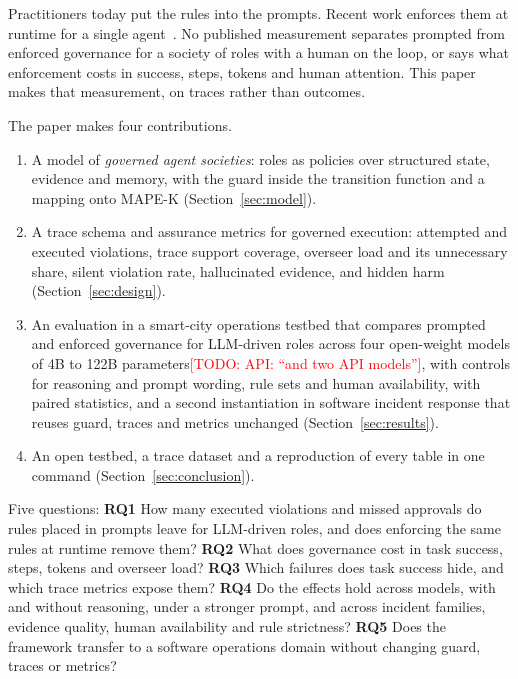 \documentclass[10pt,conference]{IEEEtran}
\newcommand{\todo}[1]{\textcolor{red}{[TODO: #1]}}
\newcommand{\RQ}[1]{\textbf{RQ#1}}
\begin{document}
Practitioners today put the rules into the prompts. Recent work enforces them at runtime for a single agent~\cite{wang2026agentspec}. No published measurement separates prompted from enforced governance for a society of roles with a human on the loop, or says what enforcement costs in success, steps, tokens and human attention. This paper makes that measurement, on traces rather than outcomes.

The paper makes four contributions.
\begin{enumerate}
    \item A model of \emph{governed agent societies}: roles as policies over structured state, evidence and memory, with the guard inside the transition function and a mapping onto MAPE-K (Section~\ref{sec:model}).
    \item A trace schema and assurance metrics for governed execution: attempted and executed violations, trace support coverage, overseer load and its unnecessary share, silent violation rate, hallucinated evidence, and hidden harm (Section~\ref{sec:design}).
    \item An evaluation in a smart-city operations testbed that compares prompted and enforced governance for LLM-driven roles across four open-weight models of 4B to 122B parameters\todo{API: ``and two API models''}, with controls for reasoning and prompt wording, rule sets and human availability, with paired statistics, and a second instantiation in software incident response that reuses guard, traces and metrics unchanged (Section~\ref{sec:results}).
    \item An open testbed, a trace dataset and a reproduction of every table in one command (Section~\ref{sec:conclusion}).
\end{enumerate}

Five questions: \RQ{1} How many executed violations and missed approvals do rules placed in prompts leave for LLM-driven roles, and does enforcing the same rules at runtime remove them? \RQ{2} What does governance cost in task success, steps, tokens and overseer load? \RQ{3} Which failures does task success hide, and which trace metrics expose them? \RQ{4} Do the effects hold across models, with and without reasoning, under a stronger prompt, and across incident families, evidence quality, human availability and rule strictness? \RQ{5} Does the framework transfer to a software operations domain without changing guard, traces or metrics?

\end{document}

